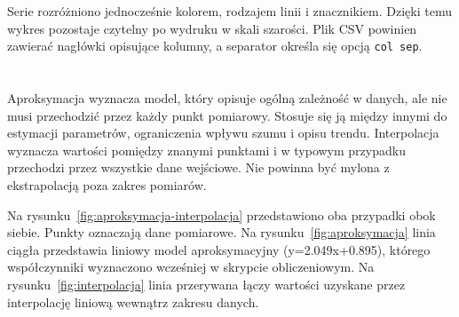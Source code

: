 Serie rozróżniono jednocześnie kolorem, rodzajem linii i znacznikiem. Dzięki temu wykres pozostaje czytelny po wydruku w skali szarości. Plik CSV powinien zawierać nagłówki opisujące kolumny, a separator określa się opcją \texttt{col sep}.

\section{}

\subsection{}

Aproksymacja wyznacza model, który opisuje ogólną zależność w danych, ale nie musi przechodzić przez każdy punkt pomiarowy. Stosuje się ją między innymi do estymacji parametrów, ograniczenia wpływu szumu i opisu trendu. Interpolacja wyznacza wartości pomiędzy znanymi punktami i w typowym przypadku przechodzi przez wszystkie dane wejściowe. Nie powinna być mylona z ekstrapolacją poza zakres pomiarów.

Na rysunku~\ref{fig:aproksymacja-interpolacja} przedstawiono oba przypadki obok siebie. Punkty oznaczają dane pomiarowe. Na rysunku~\ref{fig:aproksymacja} linia ciągła przedstawia liniowy model aproksymacyjny (y=\num{2.049}x+\num{0.895}), którego współczynniki wyznaczono wcześniej w skrypcie obliczeniowym. Na rysunku~\ref{fig:interpolacja} linia przerywana łączy wartości uzyskane przez interpolację liniową wewnątrz zakresu danych.

